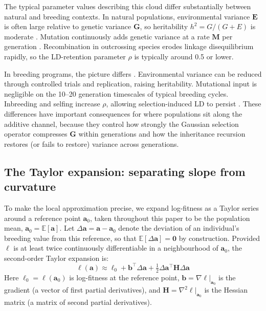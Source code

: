 \documentclass[9pt,twocolumn,twoside,lineno]{gsajnl}
\newcommand{\vect}[1]{\boldsymbol{#1}}
\newcommand{\mat}[1]{\mathbf{#1}}
\newcommand{\E}{\ensuremath{\mathbb{E}}\xspace}
\begin{document}
The typical parameter values describing this cloud differ substantially between natural and breeding contexts. In natural populations, environmental variance $\mat{E}$ is often large relative to genetic variance $\mat{G}$, so heritability $h^2 = G/(G + E)$ is moderate \citep{Visscher2008}. Mutation continuously adds genetic variance at a rate $\mat{M}$ per generation \citep{Lynch1998}. Recombination in outcrossing species erodes linkage disequilibrium rapidly, so the LD-retention parameter $\rho$ is typically around 0.5 or lower. 

In breeding programs, the picture differs \citep{Allard1999, FalconerMackay1996}. Environmental variance can be reduced through controlled trials and replication, raising heritability. Mutational input is negligible on the 10--20 generation timescales of typical breeding cycles. Inbreeding and selfing increase $\rho$, allowing selection-induced LD to persist \citep{Bulmer1971}. These differences have important consequences for where populations sit along the additive channel, because they control how strongly the Gaussian selection operator compresses $\mat{G}$ within generations and how the inheritance recursion restores (or fails to restore) variance across generations.

\subsection{The Taylor expansion: separating slope from curvature}

To make the local approximation precise, we expand log-fitness as a Taylor series around a reference point $\vect{a}_0$, taken throughout this paper to be the population mean, $\vect{a}_0 = \E[\vect{a}]$. Let $\Delta\vect{a} = \vect{a} - \vect{a}_0$ denote the deviation of an individual's breeding value from this reference, so that $\E[\Delta\vect{a}] = \vect{0}$ by construction. Provided $\ell$ is at least twice continuously differentiable in a neighbourhood of $\vect{a}_0$, the second-order Taylor expansion is:
\begin{equation}
\ell(\vect{a}) \approx \ell_0 + \vect{b}^\top \Delta\vect{a} + \tfrac{1}{2} \Delta\vect{a}^\top \mat{H} \Delta\vect{a}
\label{eq:taylor}
\end{equation}
Here $\ell_0 = \ell(\vect{a}_0)$ is log-fitness at the reference point, $\vect{b} = \nabla\ell|_{\vect{a}_0}$ is the gradient (a vector of first partial derivatives), and $\mat{H} = \nabla^2\ell|_{\vect{a}_0}$ is the Hessian matrix (a matrix of second partial derivatives).
\end{document}
